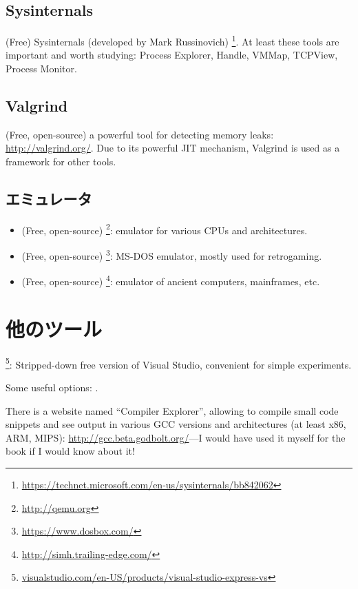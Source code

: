 \subsection{Sysinternals}

(Free) Sysinternals (developed by Mark Russinovich)
\footnote{\url{https://technet.microsoft.com/en-us/sysinternals/bb842062}}.
At least these tools are important and worth studying: Process Explorer, Handle, VMMap, TCPView, Process Monitor.

\subsection{Valgrind}

(Free, open-source) a powerful tool for detecting memory leaks: \url{http://valgrind.org/}.
Due to its powerful \ac{JIT} mechanism, Valgrind is used as a framework for other tools.


\subsection{エミュレータ}

\begin{itemize}
\item (Free, open-source) \footnote{\url{http://qemu.org}}: emulator for various CPUs and architectures.

\item (Free, open-source) \footnote{\url{https://www.dosbox.com/}}: MS-DOS emulator, mostly used for retrogaming.

\item (Free, open-source) \footnote{\url{http://simh.trailing-edge.com/}}: emulator of ancient computers, mainframes, etc.
\end{itemize}

\section{他のツール}

\footnote{\href{http://go.yurichev.com/17034}{visualstudio.com/en-US/products/visual-studio-express-vs}}:
Stripped-down free version of Visual Studio, convenient for simple experiments.

Some useful options: .

There is a website named ``Compiler Explorer'', allowing to compile small code snippets and see output
in various GCC versions and architectures
(at least x86, ARM, MIPS): \url{http://gcc.beta.godbolt.org/}---I would have used it myself for the book if I would know about it!

